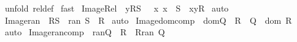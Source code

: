 \begin{isabellebody}
%
\isadelimproof
%
\endisadelimproof
%
\isatagproof
{}\isamarkupfalse%
\ {\isacharparenleft}unfold\ rel{\isacharunderscore}def{\isacharparenright}\isanewline
{}\isamarkupfalse%
\ fast\isanewline
{}\isamarkupfalse%
%
\endisatagproof
{\isafoldproof}%
%
\isadelimproof
%
\endisadelimproof
%
\isamarkuptrue%
\isamarkupfalse%
\ Image{\isacharunderscore}Rel\ {\isacharcolon}\ {\isachardoublequoteopen}y{\isacharcolon}{\isacharparenleft}R{\isacharparenleft}{\isacharbar}S{\isacharbar}{\isacharparenright}{\isacharparenright}\ {\isacharequal}\ {\isacharparenleft}{\isacharquery}\ x{\isachardot}\ {\isacharbraceleft}x{\isacharbraceright}\ {\isacharless}{\isacharequal}\ S\ {\isacharampersand}\ {\isacharparenleft}x{\isacharcomma}y{\isacharparenright}{\isacharcolon}R{\isacharparenright}{\isachardoublequoteclose}\isanewline
%
\isadelimproof
%
\endisadelimproof
%
\isatagproof
{}\isamarkupfalse%
\ auto\isanewline
{}\isamarkupfalse%
%
\endisatagproof
{\isafoldproof}%
%
\isadelimproof
\isanewline
%
\endisadelimproof
\isanewline
\isanewline
{}\isamarkupfalse%
\ Image{\isacharunderscore}ran\ {\isacharcolon}\ {\isachardoublequoteopen}R{\isacharparenleft}{\isacharbar}S{\isacharbar}{\isacharparenright}\ {\isacharequal}\ ran\ {\isacharparenleft}S\ {\isacharless}{\isacharcolon}\ R{\isacharparenright}{\isachardoublequoteclose}\isanewline
%
\isadelimproof
%
\endisadelimproof
%
\isatagproof
{}\isamarkupfalse%
\ auto\isanewline
{}\isamarkupfalse%
%
\endisatagproof
{\isafoldproof}%
%
\isadelimproof
\isanewline
%
\endisadelimproof
\isanewline
\isanewline
{}\isamarkupfalse%
\ Image{\isacharunderscore}dom{\isacharunderscore}comp\ {\isacharcolon}\ {\isachardoublequoteopen}dom{\isacharparenleft}Q\ {\isacharpercent}{\isacharsemicolon}\ R{\isacharparenright}\ {\isacharequal}\ {\isacharparenleft}Q\ {\isacharpercent}{\isachartilde}{\isacharparenright}\ {\isacharparenleft}{\isacharbar}dom\ {\isacharparenleft}R{\isacharparenright}{\isacharbar}{\isacharparenright}{\isachardoublequoteclose}\isanewline
%
\isadelimproof
%
\endisadelimproof
%
\isatagproof
{}\isamarkupfalse%
\ auto\isanewline
{}\isamarkupfalse%
%
\endisatagproof
{\isafoldproof}%
%
\isadelimproof
\isanewline
%
\endisadelimproof
\isanewline
\isanewline
{}\isamarkupfalse%
\ Image{\isacharunderscore}ran{\isacharunderscore}comp\ {\isacharcolon}\ {\isachardoublequoteopen}ran{\isacharparenleft}Q\ {\isacharpercent}{\isacharsemicolon}\ R{\isacharparenright}\ {\isacharequal}\ R{\isacharparenleft}{\isacharbar}ran\ {\isacharparenleft}Q{\isacharparenright}{\isacharbar}{\isacharparenright}{\isachardoublequoteclose}\isanewline

\end{isabellebody}
